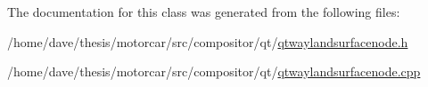 The documentation for this class was generated from the following files\-:\begin{DoxyCompactItemize}
\item 
/home/dave/thesis/motorcar/src/compositor/qt/\hyperlink{qtwaylandsurfacenode_8h}{qtwaylandsurfacenode.\-h}\item 
/home/dave/thesis/motorcar/src/compositor/qt/\hyperlink{qtwaylandsurfacenode_8cpp}{qtwaylandsurfacenode.\-cpp}\end{DoxyCompactItemize}
